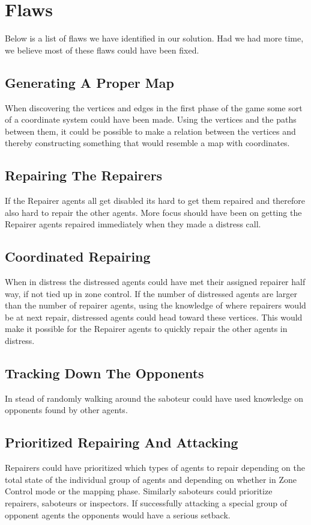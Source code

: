 \documentclass[11pt]{article}
\begin{document}
\section{Flaws}
Below is a list of flaws we have identified in our solution. Had we had more time, we believe most of these flaws could have been fixed.

\subsection{Generating A Proper Map}
When discovering the vertices and edges in the first phase of the game some sort of a coordinate system could have been made. Using the vertices and the paths between them, it could be possible to make a relation between the vertices and thereby constructing something that would resemble a map with coordinates.

\subsection{Repairing The Repairers}
If the Repairer agents all get disabled its hard to get them repaired and therefore also hard to repair the other agents. More focus should have been on getting the Repairer agents repaired immediately when they made a distress call.

\subsection{Coordinated Repairing}
When in distress the distressed agents could have met their assigned repairer half way, if not tied up in zone control. If the number of distressed agents are larger than the number of repairer agents, using the knowledge of where repairers would be at next repair, distressed agents could head toward these vertices. This would make it possible for the Repairer agents to quickly repair the other agents in distress.

\subsection{Tracking Down The Opponents}
In stead of randomly walking around the saboteur could have used knowledge on opponents found by other agents.

\subsection{Prioritized Repairing And Attacking}
Repairers could have prioritized which types of agents to repair  depending on the total state of the individual group of agents and depending on whether in Zone Control mode or the mapping phase. Similarly saboteurs could prioritize repairers, saboteurs or inspectors. If successfully attacking a special group of opponent agents the opponents would have a serious setback.
\end{document}
